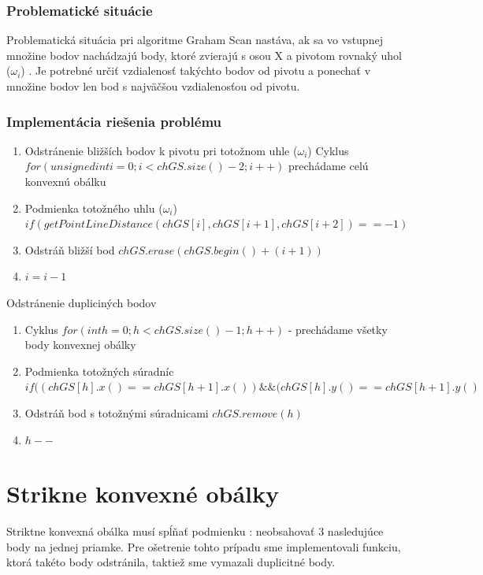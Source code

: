 \documentclass[12pt]{article}
\begin{document}
\subsubsection{Problematické situácie}
Problematická situácia pri algoritme Graham Scan nastáva, ak sa vo vstupnej množine bodov nachádzajú body, ktoré zvierajú s osou X a pivotom rovnaký uhol ($\omega_i$) . Je potrebné určiť vzdialenosť takýchto bodov od pivotu a ponechať v množine bodov len bod s najväčšou vzdialenosťou od pivotu.

\subsubsection {Implementácia riešenia problému}
\begin{enumerate}
\item Odstránenie bližších bodov k pivotu pri totožnom uhle ($\omega_i$)
\newline Cyklus $ for (unsigned  int i = 0 ; i < chGS.size() - 2; i++) $  prechádame celú konvexnú obálku
\item  Podmienka totožného uhlu ($\omega_i$) 
\newline \hspace {1.5cm}   $ if ( getPointLineDistance ( chGS[i],  chGS[i+1],  chGS[i+2])==-1) $
\item Odstráň bližší bod $  chGS.erase( chGS.begin()+(i+1)) $
\item $ i = i-1 $
\end{enumerate}

Odstránenie dupliciných bodov
\begin{enumerate}
\item Cyklus $ for (int h = 0 ; h < chGS.size() - 1; h++)$ - prechádame všetky body konvexnej obálky
\item Podmienka totožných súradníc 
\newline  $ if ((chGS[h].x() == chGS[h+1].x( )) \&\& (chGS[h].y() == chGS[h+1].y( ) $
\item \hspace {1.5cm} Odstráň  bod s totožnými súradnicami $ chGS.remove(h) $
\item \hspace {1.5cm} $h--$
\end{enumerate}


\clearpage 
\section{Strikne konvexné obálky}
Striktne konvexná obálka musí spĺňať podmienku : neobsahovať 3 nasledujúce body na jednej priamke. Pre ošetrenie tohto prípadu sme implementovali funkciu, ktorá takéto body odstránila, taktiež sme vymazali duplicitné body. 
\end{document}
